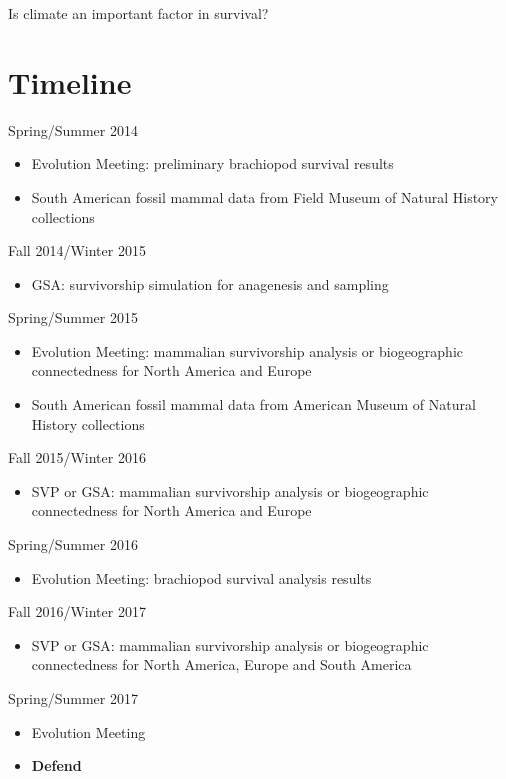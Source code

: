 \documentclass[12pt,letterpaper]{article}
\begin{document}
Is climate an important factor in survival?


\clearpage
\section{Timeline}

Spring/Summer 2014
\begin{itemize}
  \item Evolution Meeting: preliminary brachiopod survival results
  \item South American fossil mammal data from Field Museum of Natural History collections
\end{itemize}

Fall 2014/Winter 2015
\begin{itemize}
  \item GSA: survivorship simulation for anagenesis and sampling
\end{itemize}

Spring/Summer 2015
\begin{itemize}
  \item Evolution Meeting: mammalian survivorship analysis or biogeographic connectedness for North America and Europe
  \item South American fossil mammal data from American Museum of Natural History collections
\end{itemize}

Fall 2015/Winter 2016
\begin{itemize}
  \item SVP or GSA: mammalian survivorship analysis or biogeographic connectedness for North America and Europe
\end{itemize}

Spring/Summer 2016
\begin{itemize}
  \item Evolution Meeting: brachiopod survival analysis results
\end{itemize}

Fall 2016/Winter 2017
\begin{itemize}
  \item SVP or GSA: mammalian survivorship analysis or biogeographic connectedness for North America, Europe and South America
\end{itemize}

Spring/Summer 2017
\begin{itemize}
  \item Evolution Meeting
  \item \textbf{Defend}
\end{itemize}



\clearpage


\end{document}

